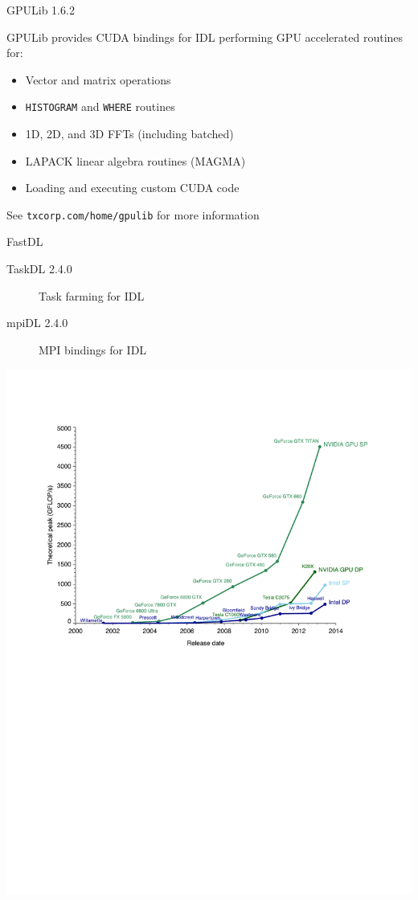 \documentclass[12pt, handout]{beamer}
\begin{document}
\appendix

\begin{frame}[t]{GPULib 1.6.2}
\hypertarget{gpulib}{}

GPULib provides CUDA bindings for IDL performing GPU accelerated routines for:
\begin{itemize}
  \item Vector and matrix operations
  \item {\tt HISTOGRAM} and {\tt WHERE} routines
  \item 1D, 2D, and 3D FFTs (including batched)
  \item LAPACK linear algebra routines (MAGMA)
  \item Loading and executing custom CUDA code
\end{itemize}
See {\tt txcorp.com/home/gpulib} for more information

\hyperlink{examples}{}
\end{frame}

\begin{frame}[t]{FastDL}
\begin{description}
  \item[TaskDL 2.4.0] Task farming for IDL
  \item[mpiDL 2.4.0] MPI bindings for IDL
\end{description}
\vspace{-2.25em}
\begin{center}
  \includegraphics[scale=0.4]{cpu-vs-gpu.pdf}
\end{center}
\end{frame}
\end{document}
